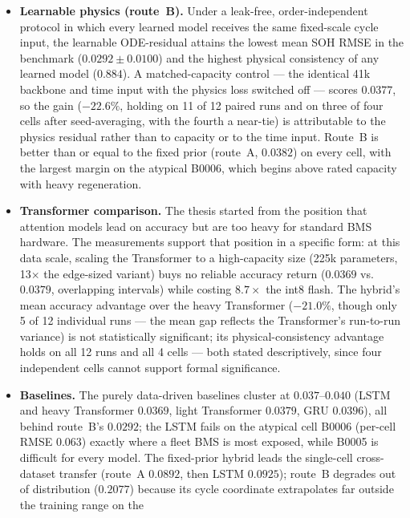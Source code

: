 \begin{itemize}
    \item \textbf{Learnable physics (route~B).} Under a leak-free,
    order-independent protocol in which every learned model receives the same
    fixed-scale cycle input, the learnable ODE-residual attains the lowest mean
    SOH RMSE in the benchmark ($0.0292 \pm 0.0100$) and the highest physical
    consistency of any learned model ($0.884$). A matched-capacity control ---
    the identical 41k backbone and time input with the physics loss switched
    off --- scores $0.0377$, so the gain ($-22.6\%$, holding on 11 of 12 paired
    runs and on three of four cells after seed-averaging, with the fourth a
    near-tie) is attributable to the
    physics residual rather than to capacity or to the time input. Route~B is
    better than or equal to the fixed prior (route~A, $0.0382$) on every cell,
    with the largest margin on the atypical B0006, which begins above rated
    capacity with heavy regeneration.
    \item \textbf{Transformer comparison.} The thesis started from the position
    that attention models lead on accuracy but are too heavy for standard BMS
    hardware. The measurements support that position in a specific form: at this
    data scale, scaling the Transformer to a high-capacity size (225k
    parameters, 13$\times$ the edge-sized variant) buys no reliable accuracy
    return ($0.0369$ vs.\ $0.0379$, overlapping intervals) while costing
    $8.7\times$ the int8 flash. The hybrid's mean accuracy advantage over the
    heavy Transformer ($-21.0\%$, though only 5 of 12 individual runs --- the
    mean gap reflects the Transformer's run-to-run variance) is not
    statistically
    significant; its physical-consistency advantage holds on all 12 runs and
    all 4 cells --- both stated descriptively, since four independent cells
    cannot support formal significance.
    \item \textbf{Baselines.} The purely data-driven baselines cluster at
    $0.037$--$0.040$ (LSTM and heavy Transformer $0.0369$, light
    Transformer $0.0379$, GRU $0.0396$), all behind route~B's $0.0292$; the
    LSTM fails on the atypical cell B0006 (per-cell RMSE $0.063$) exactly where
    a fleet BMS is most exposed, while B0005 is difficult for every model. The
    fixed-prior hybrid leads the single-cell cross-dataset transfer (route~A
    $0.0892$, then LSTM $0.0925$); route~B degrades out of distribution
    ($0.2077$) because its
    cycle coordinate extrapolates far outside the training range on the

\end{itemize}

